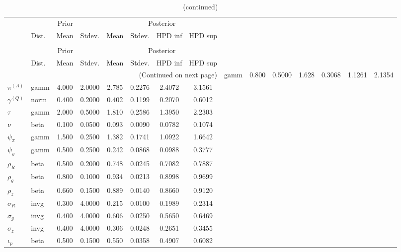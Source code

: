  
\begin{center}
\begin{longtable}{llcccccc} 
\caption{Results from Metropolis-Hastings (parameters)}
 \label{Table:MHPosterior:1}\\
\toprule 
  & \multicolumn{3}{c}{Prior}  &  \multicolumn{4}{c}{Posterior} \\
  \cmidrule(r{.75em}){2-4} \cmidrule(r{.75em}){5-8}
  & Dist. & Mean  & Stdev. & Mean & Stdev. & HPD inf & HPD sup\\
\midrule \endfirsthead 
\caption{(continued)}\\\toprule 
  & \multicolumn{3}{c}{Prior}  &  \multicolumn{4}{c}{Posterior} \\
  \cmidrule(r{.75em}){2-4} \cmidrule(r{.75em}){5-8}
  & Dist. & Mean  & Stdev. & Mean & Stdev. & HPD inf & HPD sup\\
\midrule \endhead 
\bottomrule \multicolumn{8}{r}{(Continued on next page)} \endfoot 
\bottomrule \endlastfoot 
${r_{A}}$ & gamm &   0.800 & 0.5000 &   1.628& 0.3068 &  1.1261 &  2.1354 \\ 
${\pi^{(A)}}$ & gamm &   4.000 & 2.0000 &   2.785& 0.2276 &  2.4072 &  3.1561 \\ 
${\gamma^{(Q)}}$ & norm &   0.400 & 0.2000 &   0.402& 0.1199 &  0.2070 &  0.6012 \\ 
${\tau}$ & gamm &   2.000 & 0.5000 &   1.810& 0.2586 &  1.3950 &  2.2303 \\ 
${\nu}$ & beta &   0.100 & 0.0500 &   0.093& 0.0090 &  0.0782 &  0.1074 \\ 
${\psi_\pi}$ & gamm &   1.500 & 0.2500 &   1.382& 0.1741 &  1.0922 &  1.6642 \\ 
${\psi_y}$ & gamm &   0.500 & 0.2500 &   0.242& 0.0868 &  0.0988 &  0.3777 \\ 
${\rho_R}$ & beta &   0.500 & 0.2000 &   0.748& 0.0245 &  0.7082 &  0.7887 \\ 
${\rho_{g}}$ & beta &   0.800 & 0.1000 &   0.934& 0.0213 &  0.8998 &  0.9699 \\ 
${\rho_z}$ & beta &   0.660 & 0.1500 &   0.889& 0.0140 &  0.8660 &  0.9120 \\ 
${\sigma_R}$ & invg &   0.300 & 4.0000 &   0.215& 0.0100 &  0.1989 &  0.2314 \\ 
${\sigma_{g}}$ & invg &   0.400 & 4.0000 &   0.606& 0.0250 &  0.5650 &  0.6469 \\ 
${\sigma_z}$ & invg &   0.400 & 4.0000 &   0.306& 0.0248 &  0.2651 &  0.3455 \\ 
${\iota_p}$ & beta &   0.500 & 0.1500 &   0.550& 0.0358 &  0.4907 &  0.6082 \\ 
\end{longtable}
 \end{center}

